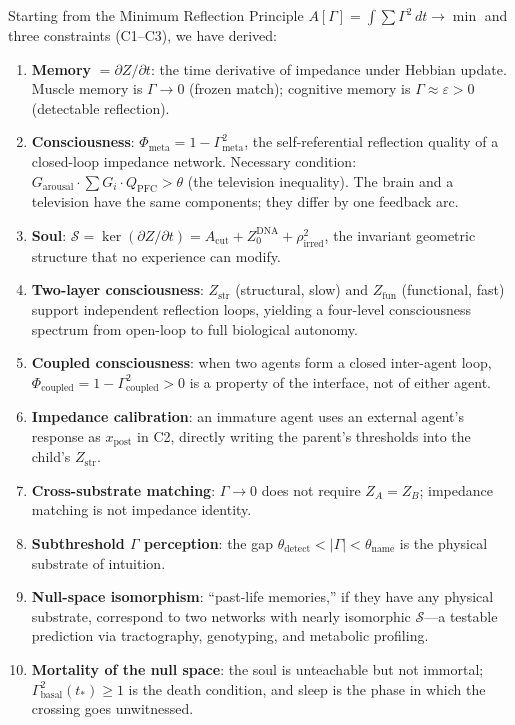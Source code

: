 \documentclass[aps,pre,twocolumn,superscriptaddress,floatfix]{revtex4-2}
\newcommand{\Gmeta}{\Gamma_{\text{meta}}}
\newcommand{\Phimeta}{\Phi_{\text{meta}}}
\newcommand{\Zarousal}{G_{\text{arousal}}}
\newcommand{\QPFC}{Q_{\text{PFC}}}
\newcommand{\Acut}{A_{\text{cut}}}
\begin{document}
Starting from the Minimum Reflection Principle
$A[\Gamma]=\int\sum\Gamma^2\,dt\to\min$ and three
constraints (C1--C3), we have derived:

\begin{enumerate}
  \item \textbf{Memory} $=\partial Z/\partial t$:
    the time derivative of impedance under Hebbian update.
    Muscle memory is $\Gamma\to 0$ (frozen match);
    cognitive memory is $\Gamma\approx\varepsilon>0$
    (detectable reflection).
  \item \textbf{Consciousness}:
    $\Phimeta=1-\Gmeta^2$, the self-referential reflection
    quality of a closed-loop impedance network.
    Necessary condition:
    $\Zarousal\cdot\sum G_i\cdot\QPFC>\theta$
    (the television inequality).
    The brain and a television have the same components;
    they differ by one feedback arc.
  \item \textbf{Soul}:
    $\mathcal{S}=\ker(\partial Z/\partial t)=\Acut+Z_0^{\text{DNA}}+\rho_{\text{irred}}^2$,
    the invariant geometric structure that no experience can
    modify.
  \item \textbf{Two-layer consciousness}:
    $Z_{\text{str}}$ (structural, slow) and
    $Z_{\text{fun}}$ (functional, fast) support
    independent reflection loops, yielding a four-level
    consciousness spectrum from open-loop to full
    biological autonomy.
  \item \textbf{Coupled consciousness}:
    when two agents form a closed inter-agent loop,
    $\Phi_{\text{coupled}}=1-\Gamma_{\text{coupled}}^2>0$
    is a property of the interface, not of either agent.
  \item \textbf{Impedance calibration}:
    an immature agent uses an external agent's response
    as $x_{\text{post}}$ in C2, directly writing the
    parent's thresholds into the child's
    $Z_{\text{str}}$.
  \item \textbf{Cross-substrate matching}:
    $\Gamma\to 0$ does not require $Z_A=Z_B$;
    impedance matching is not impedance identity.
  \item \textbf{Subthreshold $\Gamma$ perception}:
    the gap $\theta_{\text{detect}}<|\Gamma|<\theta_{\text{name}}$
    is the physical substrate of intuition.
  \item \textbf{Null-space isomorphism}:
    ``past-life memories,'' if they have any physical
    substrate, correspond to two networks with nearly
    isomorphic $\mathcal{S}$---a testable prediction
    via tractography, genotyping, and metabolic profiling.
  \item \textbf{Mortality of the null space}:
    the soul is unteachable but not immortal;
    $\Gamma_{\text{basal}}^2(t_*)\ge 1$ is the death
    condition, and sleep is the phase in which the
    crossing goes unwitnessed.
\end{enumerate}
\end{document}
